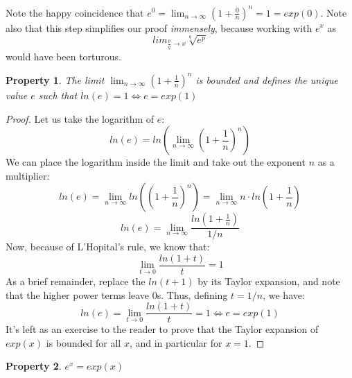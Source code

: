 \documentclass[12pt,oneside,a4paper]{article}
\newtheorem{property}{Property}
\begin{document}
Note the happy coincidence that $e^0 = \lim_{n \to \infty} \left(1+\frac{0}{n}\right)^n = 1 = exp(0)$. Note also that this step simplifies our proof \textit{immensely}, because working with $e^x$ as 
\begin{equation}
lim_{\frac{p}{q} \to x} \sqrt[q]{e^p}	
\end{equation}
would have been torturous.
\begin{property}
The limit $\lim_{n \to \infty} \left(1+ \frac{1}{n}\right)^n$ is bounded and defines the unique value $e$ such that $ln(e)=1 \iff e = exp(1)$
\end{property}
\begin{proof}
Let us take the logarithm of $e$:
\begin{equation}
ln(e) = ln\left(\lim_{n \to \infty} \left(1+ \frac{1}{n}\right)^n\right)
\end{equation}
We can place the logarithm inside the limit and take out the exponent $n$ as a multiplier:
\begin{equation}
ln(e) = \lim_{n \to \infty} ln\left(\left(1+ \frac{1}{n}\right)^n\right) = \lim_{n \to \infty} n\cdot ln\left(1+ \frac{1}{n}\right)
\end{equation}
\begin{equation}
ln(e) = \lim_{n \to \infty} \frac{ln\left(1+ \frac{1}{n}\right)}{1/n}
\end{equation}
Now, because of L'Hopital's rule, we know that:
\begin{equation}
\lim_{t \to 0} \frac{ln(1+t)}{t} = 1
\end{equation}
As a brief remainder, replace the $ln(t+1)$ by its Taylor expansion, and note that the higher power terms leave $0$s. Thus, defining $t=1/n$, we have:
\begin{equation}
ln(e) = \lim_{t \to 0} \frac{ln\left(1+ t\right)}{t} = 1 \iff e = exp(1)
\end{equation}
It's left as an exercise to the reader to prove that the Taylor expansion of $exp(x)$ is bounded for all $x$, and in particular for $x=1$.
\end{proof}
\newpage
\begin{property}
$e^x = exp(x)$
\end{property}
\end{document}
